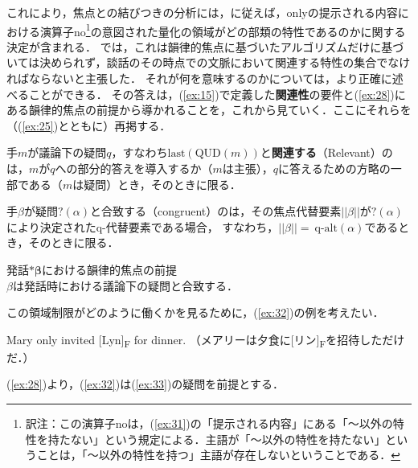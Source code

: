 \documentclass{goken}
\newcommand{\term}[2]{\textsf{#1}（#2）}
\newcommand{\ori}[1]{\noindent\textcolor[gray]{0.7}{\fontsize{8pt}{8pt}\selectfont{\textsf{(p.~#1)}}} }
\begin{document}
\renewcommand{\thefootnote}{\fnsymbol{footnote}}
\setcounter{footnote}{0}
\noindent
これにより，焦点との結びつきの分析には，\citeauthor{Rooth1985}に従えば，onlyの提示される内容における演算子no\footnote{訳注：この演算子noは，(\ref{ex:31})の「提示される内容」にある「～以外の特性を持たない」という規定による．主語が「～以外の特性を持たない」ということは，「～以外の特性を持つ」主語が存在しないということである．}の意図された量化の領域がどの部類の特性であるのかに関する決定が含まれる．
\renewcommand{\thefootnote}{\arabic{footnote}~}
\setcounter{footnote}{24}
\citealt{Roberts1995}では，これは韻律的焦点に基づいたアルゴリズムだけに基づいては決められず，談話のその時点での文脈において関連する特性の集合でなければならないと主張した．
それが何を意味するのかについては，より正確に述べることができる．
その答えは，(\ref{ex:15})で定義した\textbf{関連性}の要件と(\ref{ex:28})にある韻律的焦点の前提から導かれることを，これから見ていく．ここにそれらを（(\ref{ex:25})とともに）再掲する．

\setcounter{exx}{14}
\begin{exe}
	\ex\label{ex:re:15} 手$m$が議論下の疑問$q$，すなわち$\text{last}(\text{QUD}(m))$と\textbf{関連する}（Relevant）のは，$m$が$q$への部分的答えを導入するか（$m$は主張），$q$に答えるための方略の一部である（$m$は疑問）とき，そのときに限る．
\end{exe}

\setcounter{exx}{24}
\begin{exe}
	\ex\label{ex:re:25}
  手$\beta$が疑問$?(\alpha)$と\term{合致する}{congruent}のは，その焦点代替要素$||\beta||$が$?(\alpha)$により決定されたq-代替要素である場合，
  すなわち，$||\beta|| =\ \text{q-alt}(\alpha)$であるとき，そのときに限る．
\end{exe}

\ori{39}
\setcounter{exx}{27}
\begin{exe}
	\ex\label{ex:re:28} \textsf{発話$\boldsymbol{\ast\beta}$における韻律的焦点の前提}\\
%
  $\beta$は発話時における議論下の疑問と合致する．
\end{exe}

\noindent
この領域制限がどのように働くかを見るために，(\ref{ex:32})の例を考えたい．

\setcounter{exx}{31}
\begin{exe}
	\ex\label{ex:32} Mary only invited [Lyn]\textsubscript{F} for dinner. （メアリーは夕食に[リン]\textsubscript{F}を招待しただけだ．）
\end{exe}

\noindent
(\ref{ex:28})より，(\ref{ex:32})は(\ref{ex:33})の疑問を前提とする．
\end{document}
